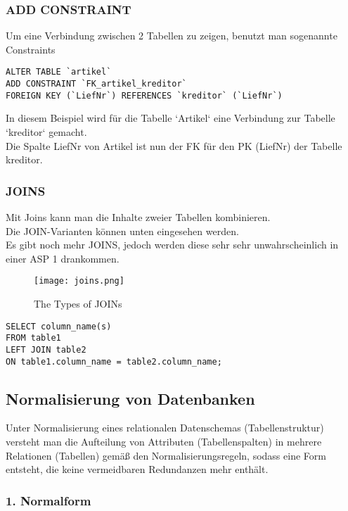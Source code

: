 \documentclass[asp1.tex]{subfiles}
\begin{document}
\subsubsection{ADD CONSTRAINT}
Um eine Verbindung zwischen 2 Tabellen zu zeigen, benutzt man sogenannte Constraints
\begin{lstlisting}
ALTER TABLE `artikel`
ADD CONSTRAINT `FK_artikel_kreditor`
FOREIGN KEY (`LiefNr`) REFERENCES `kreditor` (`LiefNr`)
\end{lstlisting}
In diesem Beispiel wird für die Tabelle `Artikel` eine Verbindung zur Tabelle `kreditor` gemacht. \\
Die Spalte LiefNr von Artikel ist nun der FK für den PK (LiefNr) der Tabelle kreditor.

\subsubsection{JOINS}
Mit Joins kann  man die  Inhalte zweier Tabellen  kombinieren. \\
Die JOIN-Varianten können unten eingesehen werden. \\
Es gibt noch mehr JOINS, jedoch werden diese sehr sehr unwahrscheinlich in einer ASP 1 drankommen.
\begin{figure}[H]
    \begin{center}
        \texttt{[image: joins.png]}
    \end{center}
    \caption{The Types of JOINs}
    \label{fig:types of joins}
\end{figure}
\begin{lstlisting}
SELECT column_name(s)
FROM table1
LEFT JOIN table2
ON table1.column_name = table2.column_name;
\end{lstlisting}

\subsection{Normalisierung von Datenbanken}

Unter Normalisierung eines relationalen Datenschemas (Tabellenstruktur) versteht man die Aufteilung von Attributen (Tabellenspalten) in mehrere Relationen (Tabellen) gemäß den Normalisierungsregeln, sodass eine Form entsteht, die keine vermeidbaren Redundanzen mehr enthält.

\subsubsection{1. Normalform}
\end{document}
